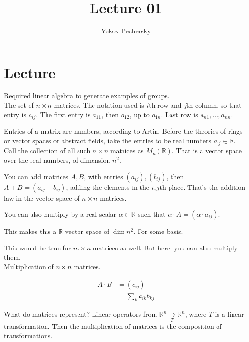 \documentclass[12pt]{article}
\newcommand{\RR}{\mathbb{R}}
\theoremstyle{definition}
\begin{document}
\author{Yakov Pechersky}

\title{Lecture 01}

\maketitle
\section*{Lecture}
Required linear algebra to generate examples of groups.
\\

The set of \( n \times n \) matrices.
The notation used is \(i\)th row and \(j\)th column, so that
entry is \(a_{ij}\). The first entry is \(a_{11}\), then \(a_{12}\),
up to \(a_{1n}\). Last row is \(a_{n1}, \ldots, a_{nn}\).

Entries of a matrix are numbers, according to Artin. Before the theories of
rings or vector spaces or abstract fields, take the entries to be real numbers
\( a_{ij} \in \RR \). Call the collection of all such \( n \times n \) matrices
as \( M_n(\RR)\). That is a vector space over the real numbers, of dimension \(n^2\).

You can add matrices \(A, B\), with entries \((a_{ij}), (b_{ij})\), then
\(A + B = (a_{ij} + b_{ij})\), adding the elements in the \(i,j\)th place.
That's the addition law in the vector space of \(n \times n\) matrices.

You can also multiply by a real scalar \(\alpha\in\RR \) such that
\(\alpha\cdot A =(\alpha\cdot a_{ij})\).

This makes this a \( \RR \) vector space of \( \dim n^2 \). For some basis.

This would be true for \(m \times n\) matrices as well. But here, you can also
multiply them.
\\

Multiplication of \(n \times n\) matrices.

\begin{equation}
\begin{split}
 A \cdot B & = (c_{ij}) \\
 & = \sum_k a_{ik}b_{kj}
\end{split}
\end{equation}

What do matrices represent? Linear operators from
\(\RR^n \xrightarrow[T]{} \RR^n\),
where \(T\) is a linear transformation.
Then the multiplication of matrices is
the composition of transformations.
\end{document}
